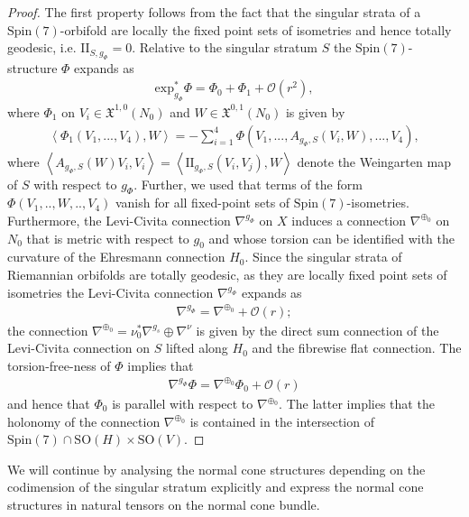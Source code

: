 \documentclass[psamsfonts]{amsart}
\theoremstyle{plain}
\theoremstyle{definition}{
\newtheorem{defi}{Definition}[section]
\newtheorem{ass}{Assumption}
\newtheorem*{nota}{Notation}}
\theoremstyle{remark}{
\newtheorem{rem}{Remark}
\newtheorem{ex}{Example}}
\theoremstyle{plain}{
\newtheorem{thm}{Theorem}[section]
\newtheorem{lem}{Lemma}[section]
\newtheorem{cor}{Corollary}[section]
\newtheorem{prop}{Proposition}[section]
\newtheorem{con}{Conjecture}[section]}
\newcommand{\m}[1]{{\mathrm{#1}}}
\begin{document}
\begin{proof}
    The first property follows from the fact that the singular strata of a $\m{Spin}(7)$-orbifold are locally the fixed point sets of isometries and hence totally geodesic, i.e. $\m{II}_{S,g_\Phi}=0$.
    Relative to the singular stratum $S$ the $\m{Spin}(7)$-structure $\Phi$ expands as 
    \begin{align*}
        \m{exp}_{g_\Phi}^*\Phi=\Phi_0+\Phi_1+\mathcal{O}(r^2),
    \end{align*}
    where $\Phi_1$ on $V_i\in \mathfrak{X}^{1,0}(N_0)$ and $W\in \mathfrak{X}^{0,1}(N_0)$ is given by 
    \begin{align*}
        \left<\Phi_1(V_1,...,V_4),W\right>=-\sum_{i=1}^4\Phi(V_1,...,A_{g_\Phi,S}(V_i,W),...,V_4),
    \end{align*}
    where $\left<A_{g_\Phi,S}(W)V_i,V_i\right>=\left<\m{II}_{g_\Phi,S}(V_i,V_j),W\right>$ denote the Weingarten map of $S$ with respect to $g_\Phi$. Further, we used that terms of the form $\Phi(V_1,..,W,..,V_4)$ vanish for all fixed-point sets of $\m{Spin}(7)$-isometries.\\
    
    Furthermore, the Levi-Civita connection $\nabla^{g_\Phi}$ on $X$ induces a connection $\nabla^{\oplus_0}$ on $N_0$ that is metric with respect to $g_0$ and whose torsion can be identified with the curvature of the Ehresmann connection $H_0$. Since the singular strata of Riemannian orbifolds are totally geodesic, as they are locally fixed point sets of isometries the Levi-Civita connection $\nabla^{g_\Phi}$ expands as 
\begin{align*}
    \nabla^{g_\Phi}=\nabla^{\oplus_0}+\mathcal{O}(r);
\end{align*}
the connection $\nabla^{\oplus_0}=\nu_0^*\nabla^{g_s}\oplus \nabla^{\nu}$ is given by the direct sum connection of the Levi-Civita connection on $S$ lifted along $H_0$ and the fibrewise flat connection.
The torsion-free-ness of $\Phi$ implies that 
\begin{align*}
    \nabla^{g_\Phi}\Phi=\nabla^{\oplus_0}\Phi_0+\mathcal{O}(r)
\end{align*}
and hence that $\Phi_0$ is parallel with respect to $\nabla^{\oplus_0}$. The latter implies that the holonomy of the connection $\nabla^{\oplus_0}$ is contained in the intersection of $\m{Spin}(7)\cap \m{SO}(H)\times\m{SO}(V)$.
\end{proof}

We will continue by analysing the normal cone structures depending on the codimension of the singular stratum explicitly and express the normal cone structures in natural tensors on the normal cone bundle. 
\end{document}
